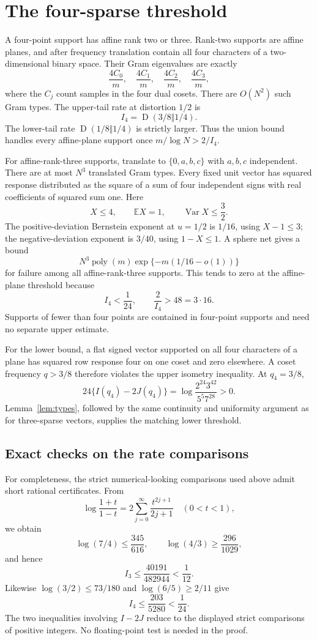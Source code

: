 \documentclass[11pt]{article}
\theoremstyle{remark}\newtheorem{remark}[theorem]{Remark}
\newcommand{\E}{\mathbb E}\newcommand{\Prob}{\mathbb P}
\newcommand{\Var}{\operatorname{Var}}\newcommand{\KL}{\operatorname{D}}
\begin{document}
\section{The four-sparse threshold}
A four-point support has affine rank two or three. Rank-two supports are affine planes, and after frequency translation contain all four characters of a two-dimensional binary space. Their Gram eigenvalues are exactly
\[
 \frac{4C_0}{m},\quad\frac{4C_1}{m},\quad\frac{4C_2}{m},\quad\frac{4C_3}{m},
\]
where the $C_j$ count samples in the four dual cosets. There are $O(N^2)$ such Gram types. The upper-tail rate at distortion $1/2$ is
\[
 I_4=\KL(3/8\Vert1/4).
\]
The lower-tail rate $\KL(1/8\Vert1/4)$ is strictly larger. Thus the union bound handles every affine-plane support once $m/\log N>2/I_4$.

For affine-rank-three supports, translate to $\{0,a,b,c\}$ with $a,b,c$ independent. There are at most $N^3$ translated Gram types. Every fixed unit vector has squared response distributed as the square of a sum of four independent signs with real coefficients of squared sum one. Here
\[
 X\le4,\qquad \E X=1,\qquad
 \Var X\le\frac32.
\]
The positive-deviation Bernstein exponent at $u=1/2$ is $1/16$, using $X-1\le3$; the negative-deviation exponent is $3/40$, using $1-X\le1$. A sphere net gives a bound
\[
 N^3\operatorname{poly}(m)\exp\{-m(1/16-o(1))\}
\]
for failure among all affine-rank-three supports. This tends to zero at the affine-plane threshold because
\[
 I_4<\frac1{24},\qquad \frac2{I_4}>48=3\cdot16.
\]
Supports of fewer than four points are contained in four-point supports and need no separate upper estimate.

For the lower bound, a flat signed vector supported on all four characters of a plane has squared row response four on one coset and zero elsewhere. A coset frequency $q>3/8$ therefore violates the upper isometry inequality. At $q_4=3/8$,
\[
 24\{I(q_4)-2J(q_4)\}
 =\log\frac{2^{24}3^{42}}{5^5 7^{28}}>0.
\]
Lemma~\ref{lem:types}, followed by the same continuity and uniformity argument as for three-sparse vectors, supplies the matching lower threshold.

\subsection{Exact checks on the rate comparisons}
For completeness, the strict numerical-looking comparisons used above admit short rational certificates. From
\[
 \log\frac{1+t}{1-t}=2\sum_{j=0}^\infty\frac{t^{2j+1}}{2j+1}\quad(0<t<1),
\]
we obtain
\[
 \log(7/4)\le\frac{345}{616},\qquad
 \log(4/3)\ge\frac{296}{1029},
\]
and hence
\[
 I_3\le\frac{40191}{482944}<\frac1{12}.
\]
Likewise $\log(3/2)\le73/180$ and $\log(6/5)\ge2/11$ give
\[
 I_4\le\frac{203}{5280}<\frac1{24}.
\]
The two inequalities involving $I-2J$ reduce to the displayed strict comparisons of positive integers. No floating-point test is needed in the proof.
\end{document}
